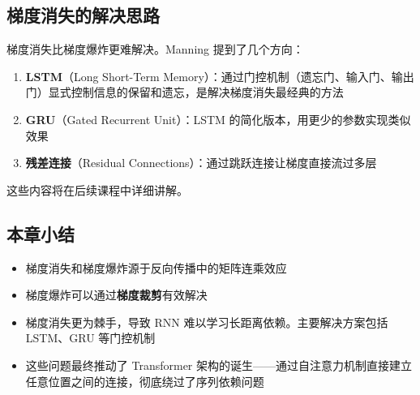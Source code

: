 \subsection{梯度消失的解决思路}

梯度消失比梯度爆炸更难解决。Manning 提到了几个方向：

\begin{enumerate}
    \item \textbf{LSTM}（Long Short-Term Memory）：通过门控机制（遗忘门、输入门、输出门）显式控制信息的保留和遗忘，是解决梯度消失最经典的方法
    \item \textbf{GRU}（Gated Recurrent Unit）：LSTM 的简化版本，用更少的参数实现类似效果
    \item \textbf{残差连接}（Residual Connections）：通过跳跃连接让梯度直接流过多层
\end{enumerate}

这些内容将在后续课程中详细讲解。

\subsection{本章小结}

\begin{itemize}
    \item 梯度消失和梯度爆炸源于反向传播中的矩阵连乘效应
    \item 梯度爆炸可以通过\textbf{梯度裁剪}有效解决
    \item 梯度消失更为棘手，导致 RNN 难以学习长距离依赖。主要解决方案包括 LSTM、GRU 等门控机制
    \item 这些问题最终推动了 Transformer 架构的诞生——通过自注意力机制直接建立任意位置之间的连接，彻底绕过了序列依赖问题
\end{itemize}


